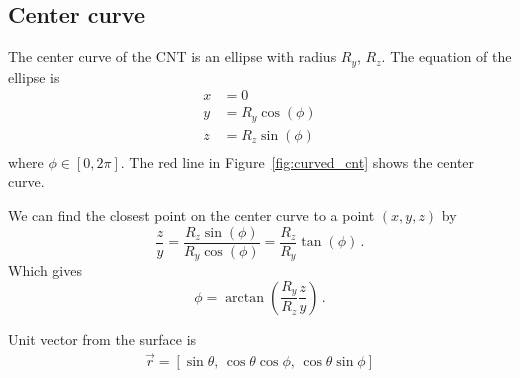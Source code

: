 \documentclass[a4paper,10pt]{article}
\numberwithin{equation}{section}
\begin{document}
\subsection{Center curve}
The center curve of the CNT is an ellipse with radius \(R_y\), \(R_z\). The equation of the ellipse is
\begin{align}
  x &= 0\\
  y &= R_y\cos(\phi)\\
  z &= R_z\sin(\phi)\\
\end{align}
where \(\phi \in [0, 2\pi]\). The red line in Figure~\ref{fig:curved_cnt} shows the center curve.

We can find the closest point on the center curve to a point \((x, y, z)\) by
\begin{equation}
  \frac{z}{y} = \frac{R_z\sin(\phi)}{R_y\cos(\phi)} = \frac{R_z}{R_y}\tan(\phi)\, .
\end{equation}
Which gives
\begin{equation}
  \phi = \arctan\left( \frac{R_y}{R_z}\frac{z}{y} \right)\, .
\end{equation}

Unit vector from the surface is
\begin{align}
  \vec{r} = \left[ \sin\theta,\, \cos\theta\cos\phi,\, \cos\theta\sin\phi \right]
\end{align}

\cleardoublepage\printbibliography
\end{document}
